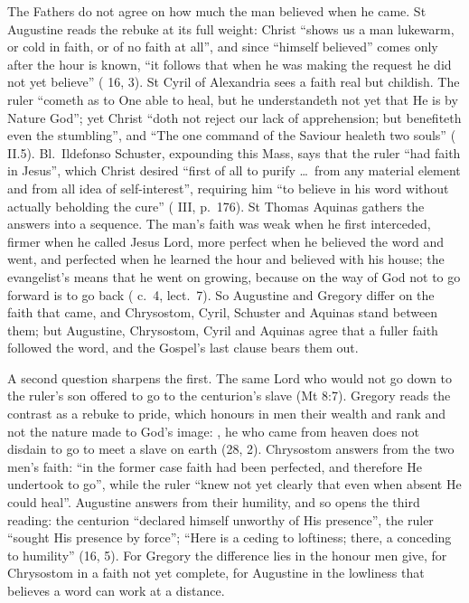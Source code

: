 The Fathers do not agree on how much the man believed when he came. St
Augustine reads the rebuke at its full weight: Christ ``shows us a man
lukewarm, or cold in faith, or of no faith at all'', and since ``himself
believed'' comes only after the hour is known, ``it follows that when he was
making the request he did not yet believe'' ( 16, 3).
St Cyril of Alexandria sees a faith real but childish. The ruler ``cometh as to
One able to heal, but he understandeth not yet that He is by Nature God''; yet
Christ ``doth not reject our lack of apprehension; but benefiteth even the
stumbling'', and ``The one command of the Saviour healeth two souls''
( II.5). Bl.\ Ildefonso Schuster, expounding this
Mass, says that the ruler ``had faith in Jesus'', which Christ desired ``first
of all to purify \dots\ from any material element and from all idea of
self-interest'', requiring him ``to believe in his word without actually
beholding the cure'' ( III, p.~176). St Thomas Aquinas
gathers the answers into a sequence. The man's faith was weak when he first
interceded, firmer when he called Jesus Lord, more perfect when he believed the
word and went, and perfected when he learned the hour and believed with his
house; the evangelist's  means that he went on growing, because
on the way of God not to go forward is to go back ( c.~4,
lect.~7). So Augustine and Gregory differ on the faith that came, and
Chrysostom, Cyril, Schuster and Aquinas stand between them; but Augustine,
Chrysostom, Cyril and Aquinas agree that a fuller faith followed the word, and
the Gospel's last clause bears them out.

A second question sharpens the first. The same Lord who would not go down to
the ruler's son offered to go to the centurion's slave (Mt 8:7). Gregory reads
the contrast as a rebuke to pride, which honours in men their wealth and rank
and not the nature made to God's image: , he who came from heaven does not disdain to go
to meet a slave on earth (28, 2). Chrysostom answers from the two men's faith:
``in the former case faith had been perfected, and therefore He undertook to
go'', while the ruler ``knew not yet clearly that even when absent He could
heal''. Augustine answers from their humility, and so opens the third reading:
the centurion ``declared himself unworthy of His presence'', the ruler ``sought
His presence by force''; ``Here is a ceding to loftiness; there, a conceding to
humility'' (16, 5). For Gregory the difference lies in the honour men give, for
Chrysostom in a faith not yet complete, for Augustine in the lowliness that
believes a word can work at a distance.

